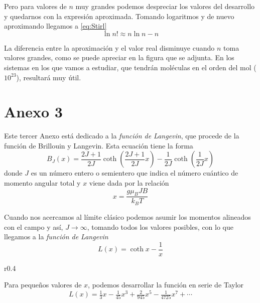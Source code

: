 Pero para valores de $n$ muy grandes podemos despreciar los valores del desarrollo y quedarnos con la expresión aproximada.
Tomando logaritmos y de nuevo aproximando llegamos a \eqref{eq:Stirl}
\begin{equation}
	\ln n! \approx n\ln n - n
\end{equation}

La diferencia entre la aproximación y el valor real disminuye cuando $n$ toma valores grandes, como se puede apreciar en la figura que se adjunta.
En los sistemas en los que vamos a estudiar, que tendrán moléculas en el orden del mol ($10^{23}$), resultará muy útil.

\newpage
\section*{Anexo 3}\label{Anx3}
\renewcommand{\theequation}{A\textsubscript{3}.\arabic{equation}}
\setcounter{equation}{0}

Este tercer Anexo está dedicado a la \emph{función de Langevin}, que procede de la función de Brillouin y Langevin.
Esta ecuación tiene la forma
\begin{equation}
	B_J(x) = \frac{2J + 1}{2J} \coth \left ( \frac{2J + 1}{2J} x \right )- \frac{1}{2J} \coth \left ( \frac{1}{2J} x \right )
\end{equation}
donde $J$ es un número entero o semientero que indica el número cuántico de momento angular total y $x$ viene dada por la relación
\begin{equation}
	x = \frac{g \mu_B J B}{k_B T}
\end{equation}

Cuando nos acercamos al límite clásico podemos asumir los momentos alineados con el campo y así, $J \rightarrow \infty$, tomando todos los valores posibles, con lo que llegamos a la \emph{función de Langevin}
\begin{equation}
	\boxed{L(x) = \coth x - \frac{1}{x}}
\end{equation}

\begin{wrapfigure}{r}{0.4\textwidth}
	\centering
\end{wrapfigure}
Para pequeños valores de $x$, podemos desarrollar la función en serie de Taylor
\begin{equation}
	L(x) = \tfrac{1}{3} x - \tfrac{1}{45} x^3 + \tfrac{2}{945} x^5 - \tfrac{1}{4725} x^7 + \cdots
\end{equation}

